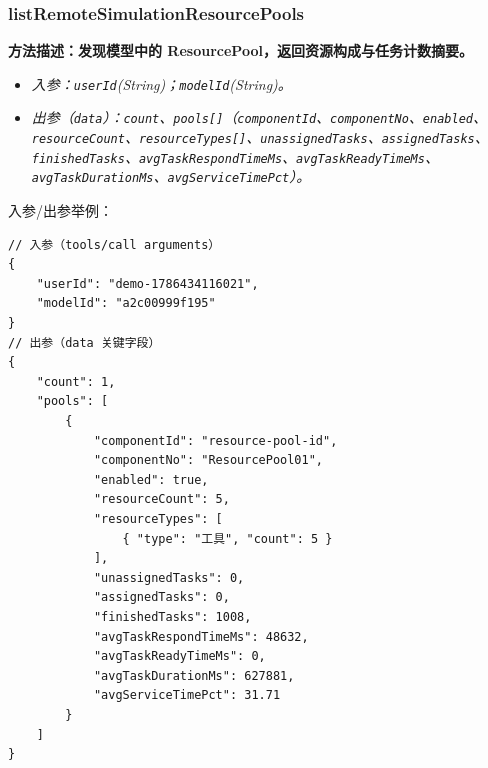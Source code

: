 \subsubsection{listRemoteSimulationResourcePools}
\bf{方法描述}：发现模型中的 ResourcePool，返回资源构成与任务计数摘要。
\begin{itemize}
	\item \it{入参}：\texttt{userId}(String)；\texttt{modelId}(String)。
	\item \it{出参}（\texttt{data}）：\texttt{count}、\texttt{pools[]}（\texttt{componentId}、\texttt{componentNo}、\texttt{enabled}、\texttt{resourceCount}、\texttt{resourceTypes[]}、\texttt{unassignedTasks}、\texttt{assignedTasks}、\texttt{finishedTasks}、\texttt{avgTaskRespondTimeMs}、\texttt{avgTaskReadyTimeMs}、\texttt{avgTaskDurationMs}、\texttt{avgServiceTimePct}）。
\end{itemize}
入参/出参举例：
\begin{lstlisting}
// 入参（tools/call arguments）
{
    "userId": "demo-1786434116021",
    "modelId": "a2c00999f195"
}
// 出参（data 关键字段）
{
    "count": 1,
    "pools": [
        {
            "componentId": "resource-pool-id",
            "componentNo": "ResourcePool01",
            "enabled": true,
            "resourceCount": 5,
            "resourceTypes": [
                { "type": "工具", "count": 5 }
            ],
            "unassignedTasks": 0,
            "assignedTasks": 0,
            "finishedTasks": 1008,
            "avgTaskRespondTimeMs": 48632,
            "avgTaskReadyTimeMs": 0,
            "avgTaskDurationMs": 627881,
            "avgServiceTimePct": 31.71
        }
    ]
}
\end{lstlisting}\vspace{-30pt}

